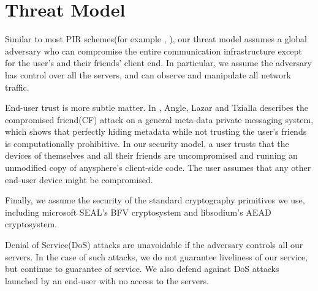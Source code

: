 \section{Threat Model}


Similar to most PIR schemes(for example \cite{ahmad2021addra}, ), our threat model assumes a global adversary who can compromise the entire communication infrastructure except for the user's and their friends' client end. In particular, we assume the adversary has control over all the servers, and can observe and manipulate all network traffic.

End-user trust is more subtle matter. In \cite{angel2018s}, Angle, Lazar and Tzialla describes the compromised friend(CF) attack on a general meta-data private messaging system, which shows that perfectly hiding metadata while not trusting the user's friends is computationally prohibitive. In our security model, a user trusts that the devices of themselves and all their friends are uncompromised and running an unmodified copy of anysphere's client-side code. The user assumes that any other end-user device might be compromised.


Finally, we assume the security of the standard cryptography primitives we use, including microsoft SEAL's BFV cryptosystem and libsodium's AEAD cryptosystem. 

Denial of Service(DoS) attacks are unavoidable if the adversary controls all our servers. In the case of such attacks, we do not guarantee liveliness of our service, but continue to guarantee of service. We also defend against DoS attacks launched by an end-user with no access to the servers.



